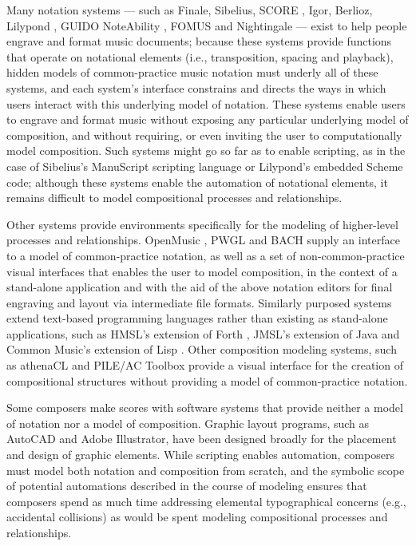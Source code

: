 \documentclass{article}
\begin{document}
Many notation systems --- such as Finale, Sibelius, SCORE \cite{Smith:1972mw},
Igor, Berlioz, Lilypond \cite{Nienhuys:2003ve}, GUIDO \cite{Hoos:1998bd}
NoteAbility \cite{hamel1noteability}, FOMUS \cite{Psenicka2006,Psenicka2009} and Nightingale --- exist to help people engrave and format music documents; because these systems provide functions
that operate on notational elements (i.e., transposition, spacing and
playback), hidden models of common-practice music notation must underly all of
these systems, and each system's interface constrains and directs the ways in
which users interact with this underlying model of notation. These systems
enable users to engrave and format music without exposing any particular
underlying model of composition, and without requiring, or even inviting the
user to computationally model composition. Such systems might go so far as to
enable scripting, as in the case of Sibelius's ManuScript \cite{Technology:qc}
scripting language or Lilypond's embedded Scheme code; although these systems
enable the automation of notational elements, it remains difficult to model
compositional processes and relationships.

Other systems provide environments specifically for the modeling of
higher-level processes and relationships. OpenMusic \cite{Assayag:1999sw}, PWGL
\cite{Laurson:2009qf} and BACH \cite{agostini2013real} supply an interface to
a model of common-practice notation, as well as a set of non-common-practice visual interfaces that enables the user to model composition, in the context of a stand-alone application and with the aid of the above notation editors for final engraving and layout via intermediate file formats. Similarly purposed systems extend text-based programming languages rather than existing as stand-alone applications, such as HMSL's extension of Forth \cite{Polansky:1990fk}, JMSL's extension of Java \cite{didkovsky2001java} and Common Music's extension of Lisp \cite{taube1991common}. Other composition modeling systems, such as athenaCL \cite{Ariza2005} and PILE/AC Toolbox \cite{Berg1979} provide a visual interface for the creation of compositional structures without providing a model of common-practice notation.

Some composers make scores with software systems that provide neither a model
of notation nor a model of composition. Graphic layout programs, such as
AutoCAD and Adobe Illustrator, have been designed broadly for the placement and
design of graphic elements. While scripting enables automation, composers must
model both notation and composition from scratch, and the symbolic scope of
potential automations described in the course of modeling ensures that
composers spend as much time addressing elemental typographical concerns (e.g.,
accidental collisions) as would be spent modeling compositional processes and
relationships.
\end{document}
